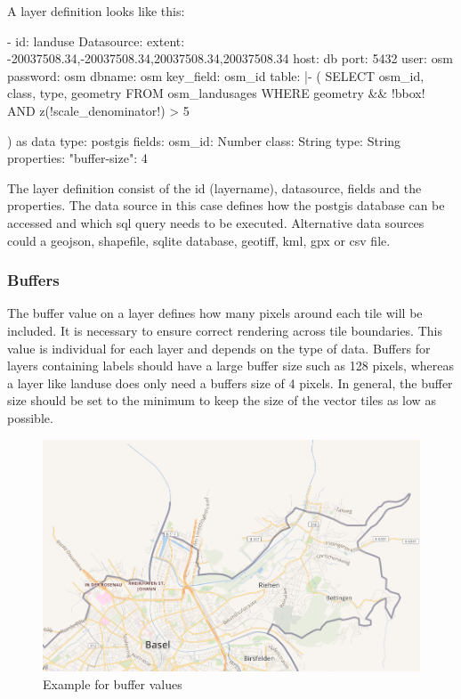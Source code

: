 A layer definition looks like this:
\begin{yamlcode}
- id: landuse
Datasource:
    extent: -20037508.34,-20037508.34,20037508.34,20037508.34
    host: db
    port: 5432
    user: osm
    password: osm
    dbname: osm
    key_field: osm_id
    table: |-
        (
            SELECT osm_id, class, type, geometry
            FROM osm_landusages
            WHERE geometry && !bbox!
            AND z(!scale_denominator!) > 5
        
        ) as data
    type: postgis
fields:
    osm_id: Number
    class: String
    type: String
properties:
    "buffer-size": 4
\end{yamlcode}
The layer definition consist of the id (layername), datasource, fields and the properties. The data source in this case defines how the postgis database can be accessed and which sql query needs to be executed. Alternative data sources could a geojson, shapefile, sqlite database, geotiff, kml, gpx or csv file.

\subsubsection{Buffers}\label{buffers}
The buffer value on a layer defines how many pixels around each tile will be included. It is necessary to ensure correct rendering across tile boundaries. This value is individual for each layer and depends on the type of data. Buffers for layers containing labels should have a large buffer size such as 128 pixels, whereas a layer like landuse does only need a buffers size of 4 pixels. In general, the buffer size should be set to the minimum to keep the size of the vector tiles as low as possible.\cite{89_mapbox.com_2015}

\begin{figure}[H]
  \centering
  \includegraphics[width=1\textwidth]{images/buffer.png}
  \caption{Example for buffer values}
\end{figure}

